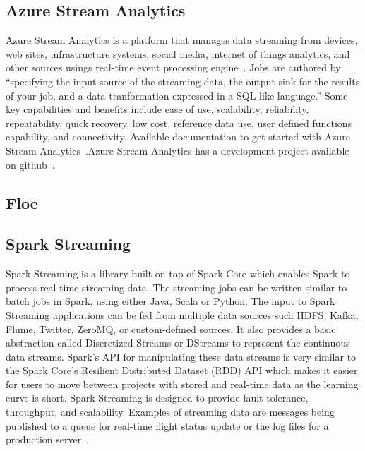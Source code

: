 \subsection{Azure Stream Analytics}

Azure Stream Analytics is a platform that manages data streaming from
devices, web sites, infrastructure systems, social media, internet of
things analytics, and other sources usings real-time event processing
engine~\cite{www-azurestreamanalytics}. Jobs are authored by
``specifying the input source of the streaming data, the output sink
for the results of your job, and a data tranformation expressed in a
SQL-like language.''  Some key capabilities and benefits include ease
of use, scalability, reliability, repeatability, quick recovery, low
cost, reference data use, user defined functions capability, and
connectivity. Available documentation to get started with Azure Stream
Analytics~\cite{www-docs-microsoft}.Azure Stream Analytics has a
development project available on github~\cite{www-github-azure}.

     \pv

     
\subsection{Floe}

\pv 

\subsection{Spark Streaming}

Spark Streaming is a library built on top of Spark Core which enables
Spark to process real-time streaming data. The streaming jobs can be
written similar to batch jobs in Spark, using either Java, Scala or
Python. The input to Spark Streaming applications can be fed from
multiple data sources such HDFS, Kafka, Flume, Twitter, ZeroMQ, or
custom-defined sources. It also provides a basic abstraction called
Discretized Streams or DStreams to represent the continuous data
streams. Spark's API for manipulating these data streams is very
similar to the Spark Core’s Resilient Distributed Dataset (RDD) API
which makes it easier for users to move between projects with stored
and real-time data as the learning curve is
short\cite{www-apache-spark-RDD}.  Spark Streaming is designed to
provide fault-tolerance, throughput, and scalability. Examples of
streaming data are messages being published to a queue for real-time
flight status update or the log files for a production
server~\cite{www-apache-spark-stream}.

